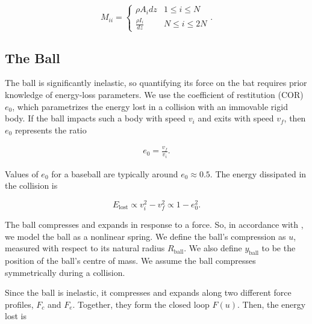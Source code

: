\documentclass[linenumbers]{aastex7}
\newcommand{\ball}{_\mathrm{ball}}
\begin{document}
\begin{equation}
	M_{ii} =
	\begin{cases}
		\rho A_i dz         & 1 \leq i \leq N  \\
		\frac{\rho I_i}{dz} & N \leq i \leq 2N
	\end{cases}.
\end{equation}

\subsection{The Ball}
The ball is significantly inelastic, so quantifying its force on the bat requires prior knowledge of energy-loss parameters. We use the coefficient of restitution (COR) $e_0$, which parametrizes the energy lost in a collision with an immovable rigid body. If the ball impacts such a body with speed $v_i$ and exits with speed $v_f$, then $e_0$ represents the ratio

\begin{eqnarray}\label{eq:e0}
	e_0 = \frac{v_f}{v_i}.
\end{eqnarray}

Values of $e_0$ for a baseball are typically around $e_0 \approx 0.5$.
The energy dissipated in the collision is

\begin{equation}
	E_{\mathrm{lost}} \propto v_i^2 - v_f^2 \propto 1 - e_{0}^2.
\end{equation}

The ball compresses and expands in response to a force. So, in accordance with \citet{crossImpactBallBat1999}, we model the ball as a nonlinear spring. We define the ball's compression as $u$, measured with respect to its natural radius $R\ball$. We also define $y\ball$ to be the position of the ball's centre of mass. We assume the ball compresses symmetrically during a collision.

Since the ball is inelastic, it compresses and expands along two different force profiles, $F_c$ and $F_e$. Together, they form the closed loop $F(u)$. Then, the energy lost is
\end{document}
